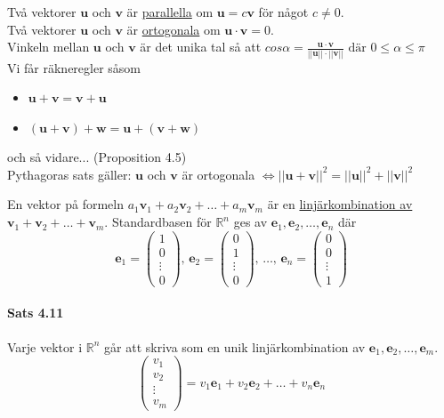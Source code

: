 Två vektorer $\bm{u}$ och $\bm{v}$ är \underline{parallella} om $\bm{u}=c\bm{v}$ för något $c\neq 0$.\\
Två vektorer $\bm{u}$ och $\bm{v}$ är \underline{ortogonala} om $\bm{u}\cdot \bm{v}=0$.\\
Vinkeln mellan $\bm{u}$ och $\bm{v}$ är det unika tal så att $cos\alpha=\frac{\bm{u}\cdot \bm{v}}{||\bm{u}||\cdot ||\bm{v}||}\text{ där } 0\leq \alpha \leq \pi$\\
Vi får räkneregler såsom
\begin{itemize}
    \item[] $\bm{u}+\bm{v}=\bm{v}+\bm{u}$
    \item[] $(\bm{u}+\bm{v})+\bm{w}=\bm{u}+(\bm{v}+\bm{w})$
\end{itemize}
och så vidare... (Proposition 4.5)\\
Pythagoras sats gäller: $\bm{u}$ och $\bm{v}$ är ortogonala $\Leftrightarrow ||\bm{u}+\bm{v}||^{2}=||\bm{u}||^{2}+||\bm{v}||^{2}$

En vektor på formeln $a_{1}\bm{v}_{1}+a_{2}\bm{v}_{2}+\ldots+a_{m}\bm{v}_{m}$ är en \underline{linjärkombination av $\bm{v}_{1}+\bm{v}_{2}+\ldots+\bm{v}_{m}$}.
Standardbasen för $\mathbb{R}^{n}$ ges av $\bm{e}_{1}, \bm{e}_{2}, \ldots, \bm{e}_{n}$ där 
\begin{equation*}
    \bm{e}_{1}=\begin{pmatrix}
        1\\0\\\vdots\\0
    \end{pmatrix}\text{, }
    \bm{e}_{2}=\begin{pmatrix}
        0\\1\\\vdots\\0
    \end{pmatrix}\text{, }
    \ldots\text{, }
    \bm{e}_{n}=\begin{pmatrix}
        0\\0\\\vdots\\1
    \end{pmatrix}
\end{equation*}
\paragraph{Sats 4.11} Varje vektor i $\mathbb{R}^{n}$ går att skriva som en unik linjärkombination av $\bm{e}_{1},\bm{e}_{2},\ldots,\bm{e}_{m}$.
\begin{equation*}
    \begin{pmatrix}
        v_{1}\\
        v_{2}\\
        \vdots\\
        v_{m}
    \end{pmatrix}=
    v_{1}\bm{e}_{1}+v_{2}\bm{e}_{2}+\ldots+v_{n}\bm{e}_{n}
\end{equation*}